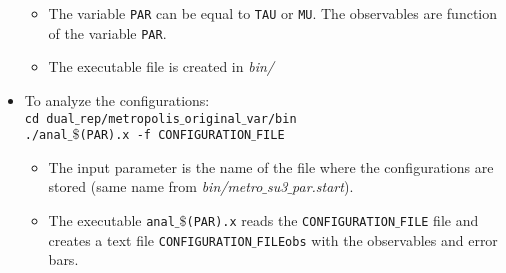 \documentclass[a4paper,10pt]{report}
\begin{document}
\begin{itemize}[leftmargin=*]
 \begin{itemize}[leftmargin=*]
  \item The variable {\tt PAR} can be equal to {\tt TAU} or {\tt MU}.
  The observables are function of the variable {\tt PAR}.
  \item The executable file is created in {\it bin/}
 \end{itemize}
 
 \item To analyze the configurations:
 \vspace*{2mm}
 \texttt{
 \\cd dual$\_$rep/metropolis$\_$original$\_$var/bin
 \\./anal$\_\$$(PAR).x -f CONFIGURATION$\_$FILE
 }

 \begin{itemize}[leftmargin=*]
  \item The input parameter is the name of the file where the configurations are stored (same
  name from {\it bin/metro$\_$su3$\_$par.start}).
  \item The executable {\tt anal$\_\$$(PAR).x} reads the {\tt CONFIGURATION$\_$FILE} file 
  and creates a text file {\tt CONFIGURATION$\_$FILEobs} with the observables and error bars.
 \end{itemize}

\end{itemize}
\end{document}
